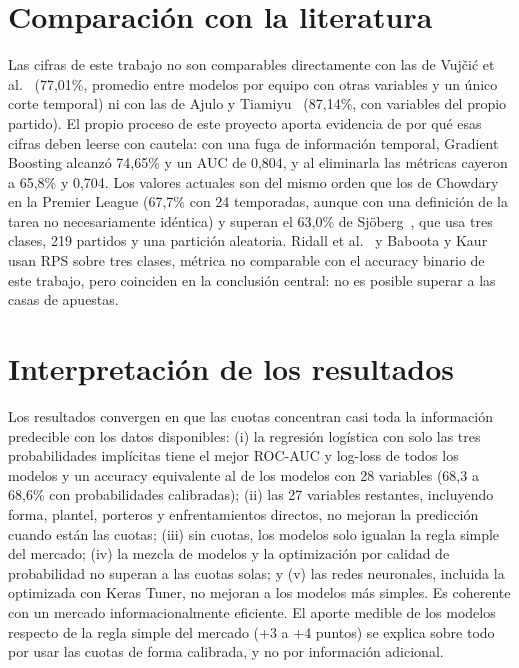 \documentclass[12pt,letterpaper,oneside]{report}
\begin{document}
\section{Comparación con la literatura}
Las cifras de este trabajo no son comparables directamente con las de Vujčić et al.~\cite{vujcic2026supervised} (77,01\%, promedio entre modelos por equipo con otras variables y un único corte temporal) ni con las de Ajulo y Tiamiyu~\cite{ajulo2026ml} (87,14\%, con variables del propio partido). El propio proceso de este proyecto aporta evidencia de por qué esas cifras deben leerse con cautela: con una fuga de información temporal, Gradient Boosting alcanzó 74,65\% y un AUC de 0,804, y al eliminarla las métricas cayeron a 65,8\% y 0,704. Los valores actuales son del mismo orden que los de Chowdary~\cite{chowdary2026dynamic} en la Premier League (67,7\% con 24 temporadas, aunque con una definición de la tarea no necesariamente idéntica) y superan el 63,0\% de Sjöberg~\cite{sjoborg2023football}, que usa tres clases, 219 partidos y una partición aleatoria. Ridall et al.~\cite{ridall2025bayesian} y Baboota y Kaur~\cite{baboota2019predictive} usan RPS sobre tres clases, métrica no comparable con el accuracy binario de este trabajo, pero coinciden en la conclusión central: no es posible superar a las casas de apuestas.

\section{Interpretación de los resultados}
Los resultados convergen en que las cuotas concentran casi toda la información predecible con los datos disponibles: (i) la regresión logística con solo las tres probabilidades implícitas tiene el mejor ROC-AUC y log-loss de todos los modelos y un accuracy equivalente al de los modelos con 28 variables (68,3 a 68,6\% con probabilidades calibradas); (ii) las 27 variables restantes, incluyendo forma, plantel, porteros y enfrentamientos directos, no mejoran la predicción cuando están las cuotas; (iii) sin cuotas, los modelos solo igualan la regla simple del mercado; (iv) la mezcla de modelos y la optimización por calidad de probabilidad no superan a las cuotas solas; y (v) las redes neuronales, incluida la optimizada con Keras Tuner, no mejoran a los modelos más simples. Es coherente con un mercado informacionalmente eficiente. El aporte medible de los modelos respecto de la regla simple del mercado (+3 a +4 puntos) se explica sobre todo por usar las cuotas de forma calibrada, y no por información adicional.
\end{document}
